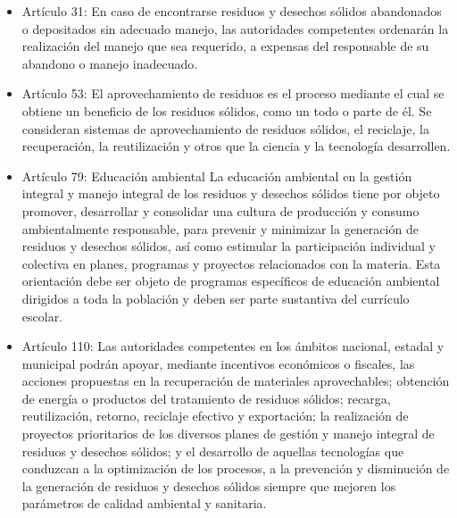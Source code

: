 \begin{itemize}
    \item Artículo 31: En caso de encontrarse residuos y desechos sólidos abandonados o depositados sin adecuado manejo, las autoridades competentes ordenarán la realización del manejo que sea requerido, a expensas del responsable de su abandono o manejo inadecuado.

    \item Artículo 53: El aprovechamiento de residuos es el proceso mediante el cual se obtiene un beneficio de los residuos sólidos, como un todo o parte de él. Se consideran sistemas de aprovechamiento de residuos sólidos, el reciclaje, la recuperación, la reutilización y otros que la ciencia y la tecnología desarrollen.
    
    \item Artículo 79: Educación ambiental La educación ambiental en la gestión integral y manejo integral de los residuos y desechos sólidos tiene por objeto promover, desarrollar y consolidar una cultura de producción y consumo ambientalmente responsable, para prevenir y minimizar la generación de residuos y desechos sólidos, así como estimular la participación individual y colectiva en planes, programas y proyectos relacionados con la materia. Esta orientación debe ser objeto de programas específicos de educación ambiental dirigidos a toda la población y deben ser parte sustantiva del currículo escolar.
    
    \item Artículo 110: Las autoridades competentes en los ámbitos nacional, estadal y municipal podrán apoyar, mediante incentivos económicos o fiscales, las acciones propuestas en la recuperación de materiales aprovechables; obtención de energía o productos del tratamiento de residuos sólidos; recarga, reutilización, retorno, reciclaje efectivo y exportación; la realización de proyectos prioritarios de los diversos planes de gestión y manejo integral de residuos y desechos sólidos; y el desarrollo de aquellas tecnologías que conduzcan a la optimización de los procesos, a la prevención y disminución de la generación de residuos y desechos sólidos siempre que mejoren los parámetros de calidad ambiental y sanitaria.
\end{itemize}

